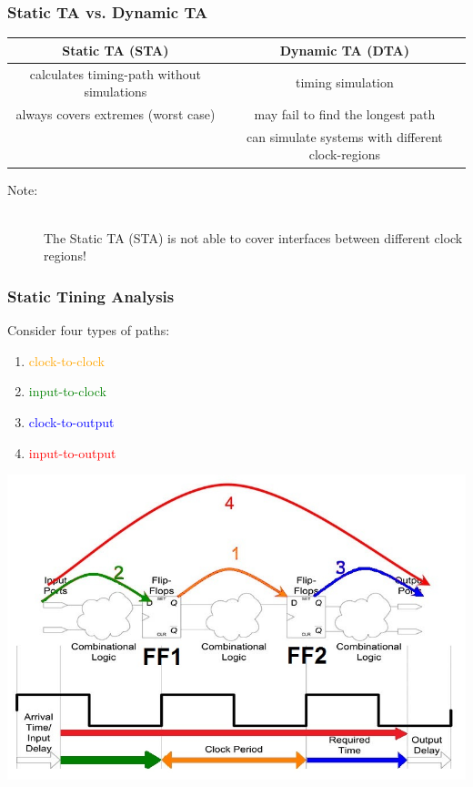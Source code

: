\newpage
\subsubsection{Static TA vs. Dynamic TA}
\begin{table}[!h]
	\centering
	\begin{tabular}{|c|c|}
		\hline
		         \textbf{Static TA (STA)}          &             \textbf{Dynamic TA (DTA)}             \\ \hline\hline
		calculates timing-path without simulations &                 timing simulation                 \\ \hline
		   always covers extremes  (worst case)    &         may fail to find the longest path         \\ \hline
		                                           & can simulate systems with different clock-regions \\ \hline
	\end{tabular}
\end{table}

\begin{description}
	\item[Note:] \hfill \\
		The Static TA (STA) is not able to cover interfaces between different clock regions!
\end{description}

\subsubsection{Static Tining Analysis}
\begin{multicols}{2}
    Consider four types of paths:
    \begin{enumerate}
        \item \textcolor{orange}{clock-to-clock}
        \item \textcolor{green}{input-to-clock}
        \item \textcolor{blue}{clock-to-output}
        \item \textcolor{red}{input-to-output}
    \end{enumerate}
    \vfill
    \columnbreak
    \includegraphics[width=0.8\linewidth]{images/HSDigital_TimingAnalysis.jpg}
\end{multicols}

